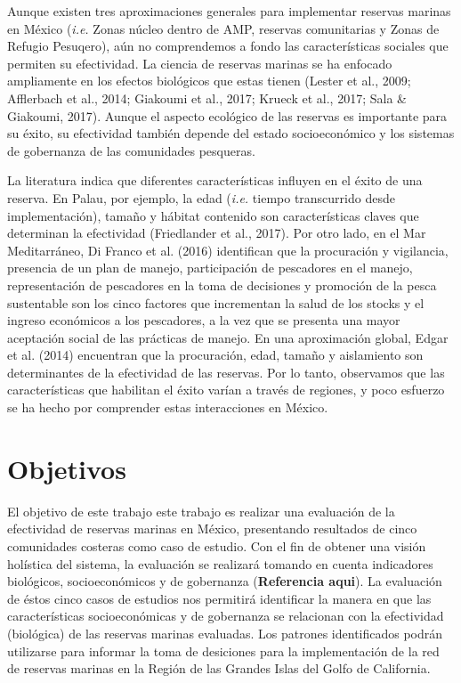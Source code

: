 \documentclass[12pt,]{article}
\begin{document}
Aunque existen tres aproximaciones generales para implementar reservas
marinas en México (\emph{i.e.} Zonas núcleo dentro de AMP, reservas
comunitarias y Zonas de Refugio Pesuqero), aún no comprendemos a fondo
las características sociales que permiten su efectividad. La ciencia de
reservas marinas se ha enfocado ampliamente en los efectos biológicos
que estas tienen (Lester et al., 2009; Afflerbach et al., 2014; Giakoumi
et al., 2017; Krueck et al., 2017; Sala \& Giakoumi, 2017). Aunque el
aspecto ecológico de las reservas es importante para su éxito, su
efectividad también depende del estado socioeconómico y los sistemas de
gobernanza de las comunidades pesqueras.

La literatura indica que diferentes características influyen en el éxito
de una reserva. En Palau, por ejemplo, la edad (\emph{i.e.} tiempo
transcurrido desde implementación), tamaño y hábitat contenido son
características claves que determinan la efectividad (Friedlander et
al., 2017). Por otro lado, en el Mar Meditarráneo, Di Franco et al.
(2016) identifican que la procuración y vigilancia, presencia de un plan
de manejo, participación de pescadores en el manejo, representación de
pescadores en la toma de decisiones y promoción de la pesca sustentable
son los cinco factores que incrementan la salud de los stocks y el
ingreso económicos a los pescadores, a la vez que se presenta una mayor
aceptación social de las prácticas de manejo. En una aproximación
global, Edgar et al. (2014) encuentran que la procuración, edad, tamaño
y aislamiento son determinantes de la efectividad de las reservas. Por
lo tanto, observamos que las características que habilitan el éxito
varían a través de regiones, y poco esfuerzo se ha hecho por comprender
estas interacciones en México.

\section{Objetivos}\label{objetivos}

El objetivo de este trabajo este trabajo es realizar una evaluación de
la efectividad de reservas marinas en México, presentando resultados de
cinco comunidades costeras como caso de estudio. Con el fin de obtener
una visión holística del sistema, la evaluación se realizará tomando en
cuenta indicadores biológicos, socioeconómicos y de gobernanza
(\textbf{Referencia aqui}). La evaluación de éstos cinco casos de
estudios nos permitirá identificar la manera en que las características
socioeconómicas y de gobernanza se relacionan con la efectividad
(biológica) de las reservas marinas evaluadas. Los patrones
identificados podrán utilizarse para informar la toma de desiciones para
la implementación de la red de reservas marinas en la Región de las
Grandes Islas del Golfo de California.
\end{document}
